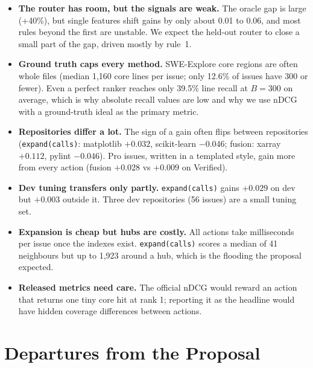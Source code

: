 \documentclass[11pt]{article}
\newcommand{\action}[1]{\texttt{#1}}
\begin{document}
\begin{itemize}
  \item \textbf{The router has room, but the signals are weak.} The oracle gap
  is large (+40\%), but single features shift gains by only about 0.01 to 0.06,
  and most rules beyond the first are unstable. We expect the held-out router
  to close a small part of the gap, driven mostly by rule~1.
  \item \textbf{Ground truth caps every method.} SWE-Explore core regions are
  often whole files (median 1,160 core lines per issue; only 12.6\% of issues
  have 300 or fewer). Even a perfect ranker reaches only 39.5\% line recall at
  $B=300$ on average, which is why absolute recall values are low and why we
  use nDCG with a ground-truth ideal as the primary metric.
  \item \textbf{Repositories differ a lot.} The sign of a gain often flips
  between repositories (\action{expand(calls)}: matplotlib $+0.032$,
  scikit-learn $-0.046$; fusion: xarray $+0.112$, pylint $-0.046$). Pro issues,
  written in a templated style, gain more from every action (fusion $+0.028$ vs
  $+0.009$ on Verified).
  \item \textbf{Dev tuning transfers only partly.} \action{expand(calls)} gains
  $+0.029$ on dev but $+0.003$ outside it. Three dev repositories (56 issues)
  are a small tuning set.
  \item \textbf{Expansion is cheap but hubs are costly.} All actions take
  milliseconds per issue once the indexes exist. \action{expand(calls)} scores
  a median of 41 neighbours but up to 1,923 around a hub, which is the flooding
  the proposal expected.
  \item \textbf{Released metrics need care.} The official nDCG would reward an
  action that returns one tiny core hit at rank 1; reporting it as the headline
  would have hidden coverage differences between actions.
\end{itemize}

\section{Departures from the Proposal}
\label{sec:dev}
\end{document}
